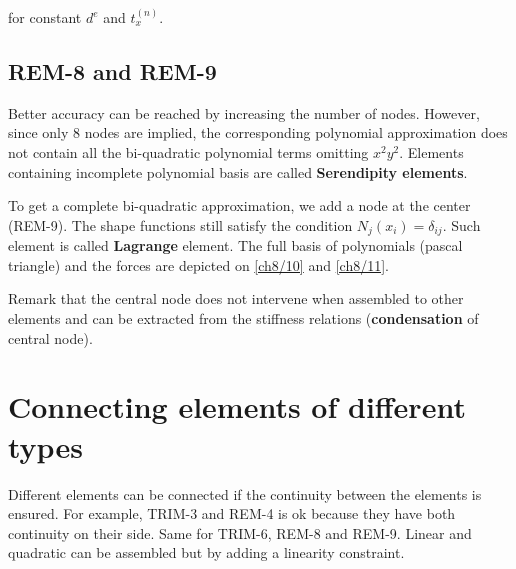 	for constant $d^e$ and $t_x^{(n)}$. 
	
\subsection{REM-8 and REM-9}
	Better accuracy can be reached by increasing the number of nodes. However, since only 8 nodes are implied, the corresponding polynomial approximation does not contain all the bi-quadratic polynomial terms omitting $x^2y^2$. Elements containing incomplete polynomial basis are called \textbf{Serendipity elements}. 
	
	To get a complete bi-quadratic approximation, we add a node at the center (REM-9). The shape functions still satisfy the condition $N_j(x_i) = \delta _{ij}$. Such element is called \textbf{Lagrange} element. The full basis of polynomials (pascal triangle) and the forces are depicted on \autoref{ch8/10} and \autoref{ch8/11}.
	
	
	Remark that the central node does not intervene when assembled to other elements and can be extracted from the stiffness relations (\textbf{condensation} of central node). 
	
\section{Connecting elements of different types}
	Different elements can be connected if the continuity between the elements is ensured. For example, TRIM-3 and REM-4 is ok because they have both continuity on their side. Same for TRIM-6, REM-8 and REM-9. Linear and quadratic can be assembled but by adding a linearity constraint. 